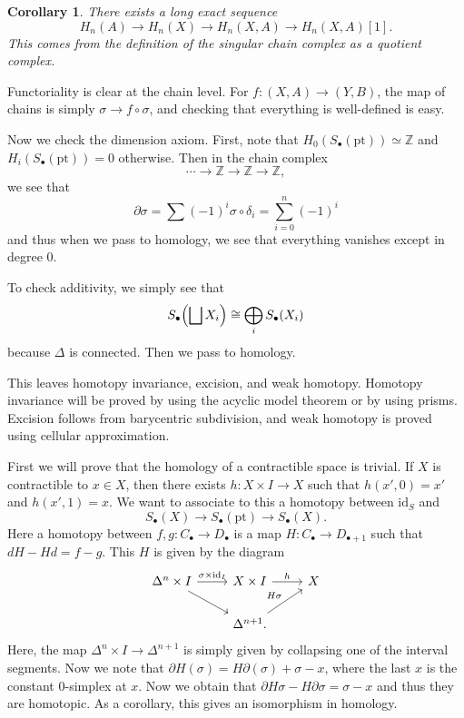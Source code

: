 \documentclass[leqno, openany]{memoir}
\newtheorem{cor}[thm]{Corollary}
\theoremstyle{definition}
\theoremstyle{remark}
\theoremstyle{plain}
\theoremstyle{definition}
\theoremstyle{remark}
\newcommand{\Z}{\mathbb{Z}}
\newcommand{\mr}[1]{\mathrm{#1}}
\begin{document}
\begin{cor}
    There exists a long exact sequence
    \[ H_n(A) \to H_n(X) \to H_n(X,A) \to H_n(X,A)[1]. \]
    This comes from the definition of the singular chain complex as a quotient complex.
\end{cor}

Functoriality is clear at the chain level. For $f \colon (X,A) \to (Y,B)$, the map of chains is simply $\sigma \to f \circ \sigma$, and checking that everything is well-defined is easy.

Now we check the dimension axiom. First, note that $H_0(S_{\bullet}(\mr{pt})) \simeq \Z$ and $H_i(S_{\bullet}(\mr{pt})) = 0$ otherwise. Then in the chain complex 
\[ \cdots \to \Z \to \Z \to \Z, \]
we see that 
\[ \partial \sigma = \sum (-1)^i \sigma \circ \delta_i = \sum_{i=0}^n (-1)^i \]
and thus when we pass to homology, we see that everything vanishes except in degree $0$.

To check additivity, we simply see that 
\[ S_{\bullet}\qty(\bigsqcup X_i) \cong \bigoplus_i S_{\bullet} (X_i) \]
because $\Delta$ is connected. Then we pass to homology. 

This leaves homotopy invariance, excision, and weak homotopy. Homotopy invariance will be proved by using the acyclic model theorem or by using prisms. Excision follows from barycentric subdivision, and weak homotopy is proved using cellular approximation.

First we will prove that the homology of a contractible space is trivial. If $X$ is contractible to $x \in X$, then there exists $h \colon X \times I \to X$ such that $h(x', 0) = x'$ and $h(x',1) = x$. We want to associate to this a homotopy between $\mr{id}_S$ and 
\[ S_{\bullet}(X) \to S_{\bullet}(\mr{pt}) \to S_{\bullet}(X). \]
Here a homotopy between $f,g \colon C_{\bullet} \to D_{\bullet}$ is a map $H \colon C_{\bullet} \to D_{\bullet + 1}$ such that $dH - Hd = f-g$.
This $H$ is given by the diagram
\begin{equation*}
\begin{tikzcd}
    \Delta^n \times I \arrow{r}{\sigma \times \mr{id}_I} \arrow{dr} & X \times I \arrow{r}{h} & X \\
                                                                    & \Delta^{n+1} \arrow{ur}{H\sigma}.
\end{tikzcd}
\end{equation*}
Here, the map $\Delta^n \times I \to \Delta^{n+1}$ is simply given by collapsing one of the interval segments. Now we note that $\partial H(\sigma) = H \partial(\sigma) + \sigma - x$, where the last $x$ is the constant $0$-simplex at $x$. Now we obtain that $\partial H \sigma - H \partial \sigma = \sigma - x$ and thus they are homotopic. As a corollary, this gives an isomorphism in homology.
\end{document}
